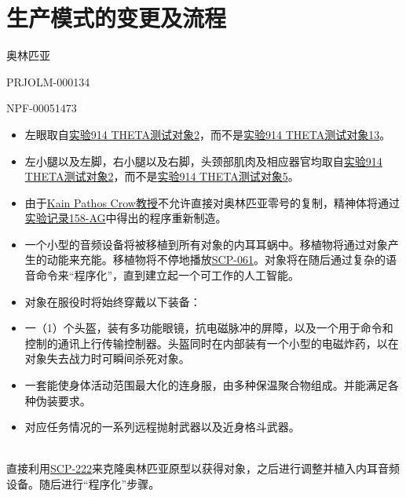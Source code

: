 \chapter{生产模式的变更及流程}

\label{chap:TALE-production-model-changes-and-procedures}

奥林匹亚

PRJOLM-000134

NPF-00051473


\begin{itemize}
\item 左眼取自\hyperref[sec:DOC-experiment-log-914-theta.2]{实验914 THETA测试对象2}，而不是\hyperref[sec:DOC-experiment-log-914-theta.13]{实验914 THETA测试对象13}。
\item 左小腿以及左脚，右小腿以及右脚，头颈部肌肉及相应器官均取自\hyperref[sec:DOC-experiment-log-914-theta.2]{实验914 THETA测试对象2}，而不是\hyperref[sec:DOC-experiment-log-914-theta.5]{实验914 THETA测试对象5}。
\item 由于\hyperref[chap:AUTHOR-kain-pathos-crow]{Kain Pathos Crow教授}不允许直接对奥林匹亚零号的复制，精神体将通过\hyperref[sec:DOC-experiment-log-158-ag]{实验记录158-AG}中得出的程序重新制造。
\end{itemize}


\begin{itemize}
\item 一个小型的音频设备将被移植到所有对象的内耳耳蜗中。移植物将通过对象产生的动能来充能。移植物将不停地播放\hyperref[chap:SCP-061]{SCP-061}。对象将在随后通过复杂的语音命令来“程序化”，直到建立起一个可工作的人工智能。
\item 对象在服役时将始终穿戴以下装备：
\item 一（1）个头盔，装有多功能眼镜，抗电磁脉冲的屏障，以及一个用于命令和控制的通讯上行传输控制器。头盔同时在内部装有一个小型的电磁炸药，以在对象失去战力时可瞬间杀死对象。
\item 一套能使身体活动范围最大化的连身服，由多种保温聚合物组成。并能满足各种伪装要求。
\item 对应任务情况的一系列远程抛射武器以及近身格斗武器。
\end{itemize}

\\
直接利用\hyperref[chap:SCP-222]{SCP-222}来克隆奥林匹亚原型以获得对象，之后进行调整并植入内耳音频设备。随后进行“程序化”步骤。
